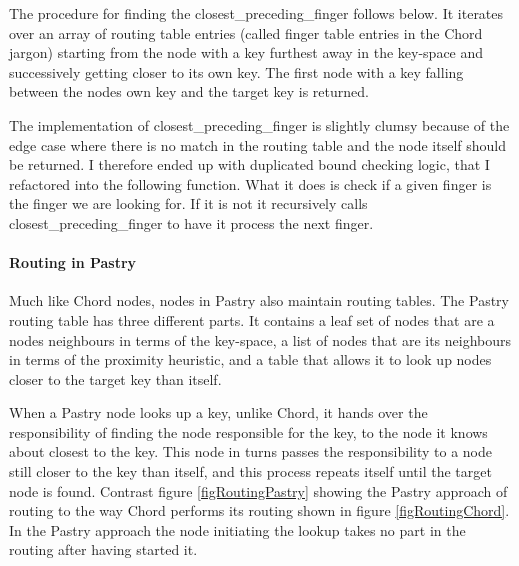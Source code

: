 

The procedure for finding the closest\_preceding\_finger follows below.
It iterates over an array of routing table entries (called finger table entries in the Chord jargon) starting from the node with a key furthest away in the key-space and successively getting closer to its own key. The first node with a key falling between the nodes own key and the target key is returned.



The implementation of closest\_preceding\_finger is slightly clumsy because of the edge case where there is no match in the routing table and the node itself should be returned. I therefore ended up with duplicated bound checking logic, that I refactored into the following function. What it does is check if a given finger is the finger we are looking for. If it is not it recursively calls closest\_preceding\_finger to have it process the next finger.




\paragraph{Routing in Pastry}
Much like Chord nodes, nodes in Pastry also maintain routing tables. The Pastry routing table has three different parts. It contains a leaf set of nodes that are a nodes neighbours in terms of the key-space, a list of nodes that are its neighbours in terms of the proximity heuristic, and a table that allows it to look up nodes closer to the target key than itself.

When a Pastry node looks up a key, unlike Chord, it hands over the responsibility of finding the node responsible for the key, to the node it knows about closest to the key. This node in turns passes the responsibility to a node still closer to the key than itself, and this process repeats itself until the target node is found. Contrast figure \ref{figRoutingPastry} showing the Pastry approach of routing to the way Chord performs its routing shown in figure \ref{figRoutingChord}. In the Pastry approach the node initiating the lookup takes no part in the routing after having started it.

